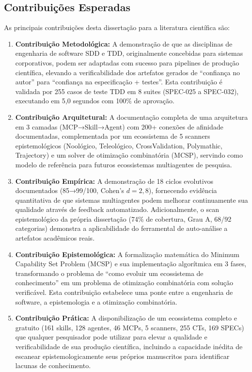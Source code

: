 \subsection{Contribuições Esperadas}

As principais contribuições desta dissertação para a literatura científica são:

\begin{enumerate}
  \item \textbf{Contribuição Metodológica:} A demonstração de que as disciplinas de engenharia de software SDD e TDD, originalmente concebidas para sistemas corporativos, podem ser adaptadas com sucesso para pipelines de produção científica, elevando a verificabilidade dos artefatos gerados de ``confiança no autor'' para ``confiança na especificação + testes''. Esta contribuição é validada por 255 casos de teste TDD em 8 suites (SPEC-025 a SPEC-032), executando em 5,0 segundos com 100\% de aprovação.

  \item \textbf{Contribuição Arquitetural:} A documentação completa de uma arquitetura em 3 camadas (MCP→Skill→Agent) com 200+ conexões de afinidade documentadas, complementada por um ecossistema de 5 scanners epistemológicos (Noológico, Teleológico, CrossValidation, Polymathic, Trajectory) e um solver de otimização combinatória (MCSP), servindo como modelo de referência para futuros ecossistemas multiagentes de pesquisa.

  \item \textbf{Contribuição Empírica:} A demonstração de 18 ciclos evolutivos documentados (85→99/100, Cohen's $d = 2,8$), fornecendo evidência quantitativa de que sistemas multiagentes podem melhorar continuamente sua qualidade através de feedback automatizado. Adicionalmente, o scan epistemológico da própria dissertação (74\% de cobertura, Grau A, 68/92 categorias) demonstra a aplicabilidade do ferramental de auto-análise a artefatos acadêmicos reais.

  \item \textbf{Contribuição Epistemológica:} A formalização matemática do Minimum Capability Set Problem (MCSP) e sua implementação algorítmica em 3 fases, transformando o problema de ``como evoluir um ecossistema de conhecimento'' em um problema de otimização combinatória com solução verificável. Esta contribuição estabelece uma ponte entre a engenharia de software, a epistemologia e a otimização combinatória.

  \item \textbf{Contribuição Prática:} A disponibilização de um ecossistema completo e gratuito (161 skills, 128 agentes, 46 MCPs, 5 scanners, 255 CTs, 169 SPECs) que qualquer pesquisador pode utilizar para elevar a qualidade e verificabilidade de sua produção científica, incluindo a capacidade inédita de escanear epistemologicamente seus próprios manuscritos para identificar lacunas de conhecimento.

\end{enumerate}

\newpage
